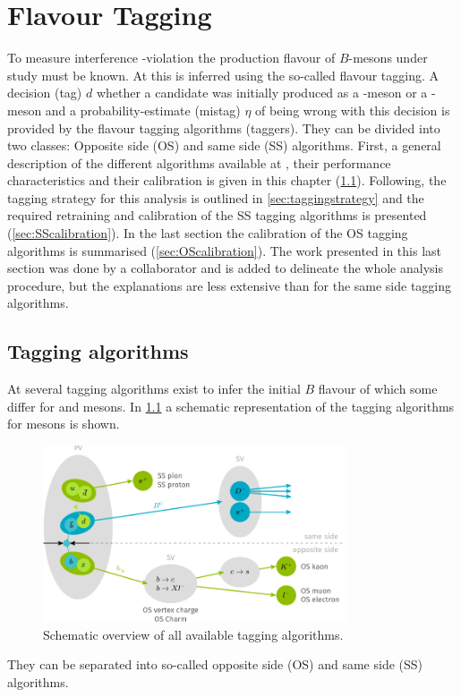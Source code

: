 \chapter{Flavour Tagging}
\label{ch:flavourtagging}

To measure interference \CP-violation the production flavour of $B$-mesons under study must be known.
At \lhcb this is inferred using the so-called flavour tagging.
A decision (tag) $d$ whether a \B candidate was initially produced as a \Bz-meson or a \Bzb-meson and a probability-estimate (mistag) $\eta$ of being wrong with this decision is provided by the flavour tagging algorithms (taggers).
They can be divided into two classes: Opposite side (OS) and same side (SS) algorithms.
First, a general description of the different algorithms available at \lhcb, their performance characteristics and their calibration is given in this chapter (\cref{sec:taggingalgorithms}).
Following, the tagging strategy for this analysis is outlined in \cref{sec:taggingstrategy} and the required retraining and calibration of the SS tagging algorithms is presented (\cref{sec:SScalibration}).
In the last section the calibration of the OS tagging algorithms is summarised (\cref{sec:OScalibration}).
The work presented in this last section was done by a collaborator and is added to delineate the whole analysis procedure, but the explanations are less extensive than for the same side tagging algorithms.


\section{Tagging algorithms}
\label{sec:taggingalgorithms}

At \lhcb several tagging algorithms exist to infer the initial $B$ flavour of which some differ for \Bz and \Bs mesons.
In \cref{fig:taggingalgorithms} a schematic representation of the tagging algorithms for \Bz mesons is shown.
\begin{figure}[tbp]
    \centering
    \includegraphics[width=0.8\textwidth]{08FlavourTagging/figs/FTscheme.pdf}
    \caption{Schematic overview of all available \Bz tagging algorithms.}
    \label{fig:taggingalgorithms}
\end{figure}
They can be separated into so-called opposite side (OS) and same side (SS) algorithms.

